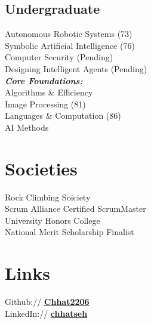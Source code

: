 \documentclass[]{deedy-resume-reversed}
\begin{document}
\begin{minipage}[t]{0.33\textwidth}
\subsection{Undergraduate}
Autonomous Robotic Systems (73) \\
Symbolic Artificial Intelligence (76) \\
Computer Security (Pending) \\
Designing Intelligent Agents (Pending) \\
{\footnotesize \textit{\textbf{Core Foundations:}}} \\
Algorithms \& Efficiency  \textbullet{} \\
Image Processing (81) \\
Languages \& Computation (86) \\
\textbullet{} AI Methods \\
\sectionsep



\section{Societies}
Rock Climbing Soiciety\\
Scrum Alliance Certified ScrumMaster\\
University Honors College\\
National Merit Scholarship Finalist \\
\sectionsep


\section{Links}
Github:// \href{https://github.com/}{\bf Chhat2206} \\
LinkedIn://  \href{https://www.linkedin.com/}{\bf chhatseh}
\sectionsep

\end{minipage}
\end{document}
